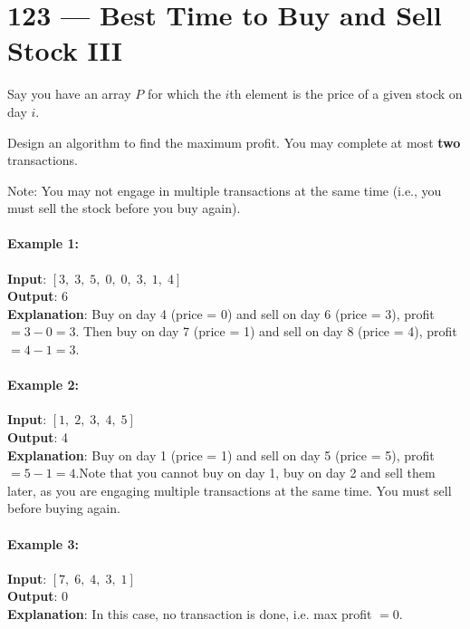 \section{123 --- Best Time to Buy and Sell Stock III}
Say you have an array $P$ for which the $i$th element is the price of a given stock on day $i$.
\par
Design an algorithm to find the maximum profit. You may complete at most \textbf{two} transactions.
\par
Note: You may not engage in multiple transactions at the same time (i.e., you must sell the stock before you buy again).
\paragraph{Example 1:}
\begin{flushleft}
\textbf{Input}: $[3,\;3,\;5,\;0,\;0,\;3,\;1,\;4]$
\\
\textbf{Output}: 6
\\
\textbf{Explanation}: Buy on day 4 (price = 0) and sell on day 6 (price = 3), profit $= 3-0 = 3$. Then buy on day 7 (price = 1) and sell on day 8 (price = 4), profit $= 4-1 = 3$.
\end{flushleft}
\paragraph{Example 2:}
\begin{flushleft}
\textbf{Input}: $[1,\;2,\;3,\;4,\;5]$
\\
\textbf{Output}: 4
\\
\textbf{Explanation}: Buy on day 1 (price = 1) and sell on day 5 (price = 5), profit $= 5-1 = 4$.Note that you cannot buy on day 1, buy on day 2 and sell them later, as you are engaging multiple transactions at the same time. You must sell before buying again.
\end{flushleft}
\paragraph{Example 3:}
\begin{flushleft}
\textbf{Input}: $[7,\;6,\;4,\;3,\;1]$
\\
\textbf{Output}: 0
\\
\textbf{Explanation}: In this case, no transaction is done, i.e. max profit $= 0$.
\end{flushleft}
